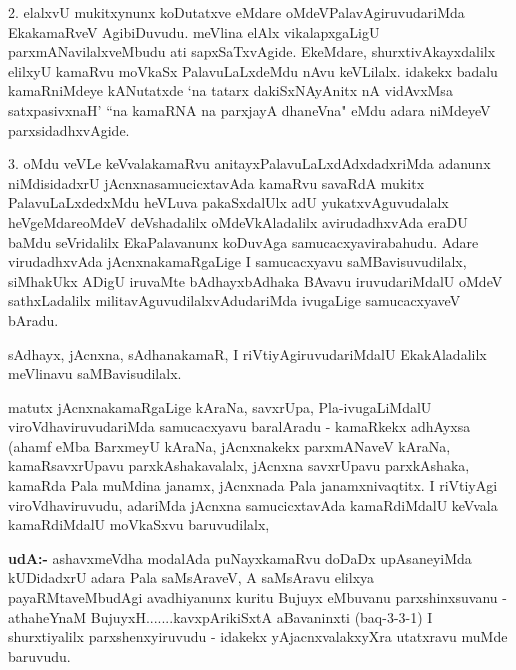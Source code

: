 \begin{artha}
2. elalxvU mukitxynunx koDutatxve eMdare oMdeVPalavAgiruvudariMda EkakamaRveV AgibiDuvudu. meVlina elAlx vikalapxgaLigU parxmANavilalxveMbudu ati sapxSaTxvAgide. EkeMdare, shurxtivAkayxdalilx elilxyU kamaRvu moVkaSx PalavuLaLxdeMdu nAvu keVLilalx. idakekx badalu kamaRniMdeye kANutatxde `na tatarx dakiSxNAyAnitx nA vidAvxMsa satxpasivxnaH' ``na kamaRNA na parxjayA dhaneVna" eMdu adara niMdeyeV parxsidadhxvAgide.
\end{artha}

\begin{artha}
3. oMdu veVLe keVvalakamaRvu anitayxPalavuLaLxdAdxdadxriMda adanunx niMdisidadxrU jAcnxnasamucicxtavAda kamaRvu savaRdA mukitx PalavuLaLxdedxMdu heVLuva pakaSxdalUlx adU yukatxvAguvudalalx heVgeMdare\mdash  oMdeV deVshadalilx oMdeVkAladalilx avirudadhxvAda eraDU baMdu seVridalilx EkaPalavanunx koDuvAga samucacxyavirabahudu. Adare virudadhxvAda jAcnxnakamaRgaLige I samucacxyavu saMBavisuvudilalx, siMhakUkx ADigU iruvaMte bAdhayxbAdhaka BAvavu iruvudariMdalU oMdeV sathxLadalilx militavAguvudilalxvAdudariMda ivugaLige samucacxyaveV bAradu.
\end{artha}

\begin{artha}
sAdhayx, jAcnxna, sAdhanakamaR, I riVtiyAgiruvudariMdalU EkakAladalilx meVlinavu 
saMBavisudilalx.
\end{artha}


\begin{artha}
matutx jAcnxnakamaRgaLige kAraNa, savxrUpa, Pla-ivugaLiMdalU viroVdhaviruvudariMda samucacxyavu baralAradu - kamaRkekx adhAyxsa (ahamf eMba BarxmeyU kAraNa, jAcnxnakekx parxmANaveV kAraNa, kamaRsavxrUpavu parxkAshakavalalx, jAcnxna savxrUpavu parxkAshaka, kamaRda Pala muMdina janamx, jAcnxnada Pala janamxnivaqtitx. I riVtiyAgi viroVdhaviruvudu, adariMda jAcnxna samucicxtavAda kamaRdiMdalU keVvala kamaRdiMdalU moVkaSxvu baruvudilalx, 
\end{artha}


\begin{artha}
{\bf udA:-} ashavxmeVdha modalAda puNayxkamaRvu doDaDx upAsaneyiMda kUDidadxrU adara Pala saMsAraveV, A saMsAravu elilxya payaRMtaveMbudAgi avadhiyanunx kuritu Bujuyx eMbuvanu parxshinxsuvanu - athaheYnaM BujuyxH.......kavxpArikiSxtA aBavaninxti (baq-3-3-1) I shurxtiyalilx parxshenxyiruvudu - idakekx yAjacnxvalakxyXra utatxravu muMde baruvudu.
\end{artha}

